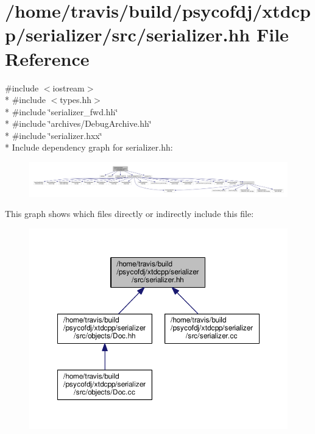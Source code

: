 \hypertarget{serializer_8hh}{\section{/home/travis/build/psycofdj/xtdcpp/serializer/src/serializer.hh File Reference}
\label{serializer_8hh}
}
{\ttfamily \#include $<$iostream$>$}\\*
{\ttfamily \#include $<$types.\-hh$>$}\\*
{\ttfamily \#include \char`\"{}serializer\-\_\-fwd.\-hh\char`\"{}}\\*
{\ttfamily \#include \char`\"{}archives/\-Debug\-Archive.\-hh\char`\"{}}\\*
{\ttfamily \#include \char`\"{}serializer.\-hxx\char`\"{}}\\*
Include dependency graph for serializer.\-hh\-:
\nopagebreak
\begin{figure}[H]
\begin{center}
\leavevmode
\includegraphics[width=350pt]{serializer_8hh__incl}
\end{center}
\end{figure}
This graph shows which files directly or indirectly include this file\-:
\nopagebreak
\begin{figure}[H]
\begin{center}
\leavevmode
\includegraphics[width=350pt]{serializer_8hh__dep__incl}
\end{center}
\end{figure}

